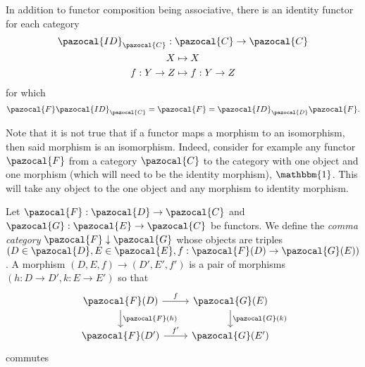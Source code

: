 \begin{remark}\label{IdentityFunctor}
    In addition to functor composition being associative, there is an identity functor for each category 
    \begin{gather*}
        \pazocal{ID}_\pazocal{C}: \pazocal{C}\rightarrow \pazocal{C}\\
        X\mapsto X\\
        f : Y\rightarrow Z \mapsto f : Y\rightarrow Z
    \end{gather*}
    for which 
    $$
        \pazocal{F}\pazocal{ID}_\pazocal{C}=\pazocal{F}=\pazocal{ID}_\pazocal{D}\pazocal{F}.
    $$ 
\end{remark}
\begin{example}
    Note that it is not true that if a functor maps a morphism to an isomorphism, then said morphism is an isomorphism. Indeed, consider for example any functor $\pazocal{F}$ from a category $\pazocal{C}$ to the category with one object and one morphism (which will need to be the identity morphism), $\mathbbm{1}$. This will take any object to the one object and any morphism to identity morphism.   
\end{example}
\begin{definition}
    Let $\pazocal{F}:\pazocal{D}\rightarrow \pazocal{C}$ and $\pazocal{G}:\pazocal{E}\rightarrow \pazocal{C}$ be functors. We define the \emph{comma category} $\pazocal{F}\downarrow \pazocal{G}$ whose objects are triples $(D\in \pazocal{D}, E\in\pazocal{E}, f:\pazocal{F}(D)\rightarrow \pazocal{G}(E))$. A morphism $(D,E,f)\rightarrow (D',E',f')$  is a pair of morphisms $(h: D\rightarrow D',k: E\rightarrow E')$ so that
    $$
        \begin{tikzcd}
            \pazocal{F}(D) \arrow[r, "f"] \arrow[d,"\pazocal{F}(h)"] & \pazocal{G}(E) \arrow[d,"\pazocal{G}(k)"]\\
            \pazocal{F}(D')\arrow[r,"f'"] & \pazocal{G}(E')  
        \end{tikzcd}
    $$
    commutes
\end{definition}
